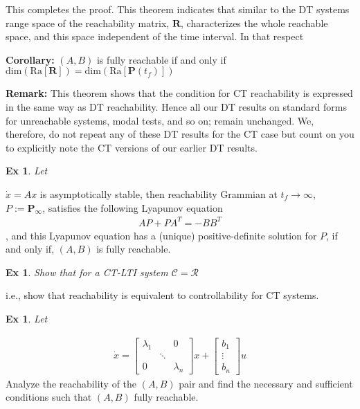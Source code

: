 \documentclass[twoside]{article}
\newtheorem{exmp}[theorem]{Ex}
\begin{document}
%
This completes the proof. This theorem indicates that similar to the DT systems range space of the
reachability matrix, $\mathbf{R}$, characterizes the whole reachable space, and this space independent
of the time interval. In that respect 

\textbf{Corollary:} $(A,B)$ is fully reachable if and only if $\mathrm{dim} \left( \mathrm{Ra} [ \mathbf{R} ] \right) = \mathrm{dim} \left( \mathrm{Ra} [ \textbf{P}(t_f) ] \right)$

\textbf{Remark:} This theorem shows that the condition for CT reachability is expressed in the same way 
as DT reachability. Hence all our DT results on standard forms for unreachable systems, modal tests, and so on; remain unchanged. We, therefore, do not repeat any of these DT results for the CT case but count on you to explicitly note the CT versions of our earlier DT results.

\begin{exmp}
Let 
\end{exmp}
$\dot{x} = A x$ is asymptotically stable, then reachability Grammian at $t_f \to \infty$, $P := \mathbf{P}_{\infty}$,
satisfies the following Lyapunov equation
%
\begin{align*}
    A P + P A^T = - B B^T
\end{align*}
% 
, and this Lyapunov equation has a (unique) positive-definite solution for $P$,
if and only if, $(A,B)$ is fully reachable.

\begin{exmp}
Show that for a CT-LTI system $\mathcal{C} = \mathcal{R}$
\end{exmp}
i.e., show that reachability is equivalent to controllability for CT systems. 

\begin{exmp}
Let 
\end{exmp}
%
%
\begin{align*}
    \dot{x} = \begin{bmatrix} \lambda_1 & & 0  \\
    & \ddots &
    \\
    0 & &  \lambda_n 
    \end{bmatrix} x + \begin{bmatrix} b_1 \\ \vdots \\ b_n \end{bmatrix} u
\end{align*}
% 
Analyze the reachability of the $(A,B)$ pair and
find the necessary and sufficient conditions such that 
$(A,B)$ fully reachable.
\end{document}
